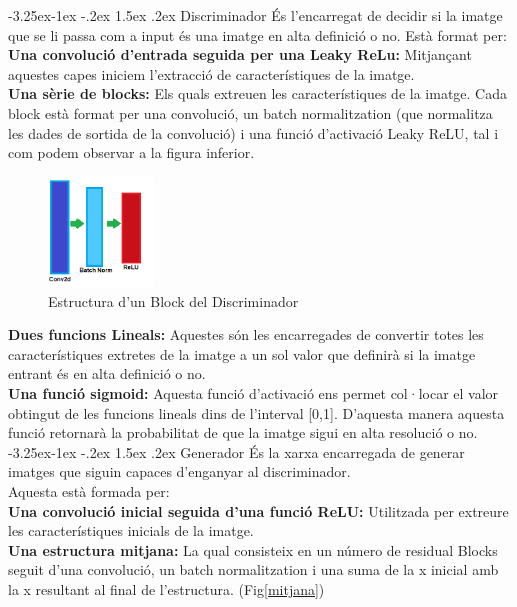 ﻿\documentclass[10pt,a4paper,twocolumn,twoside]{article}
\makeatletter
\renewcommand\subparagraph{\@startsection{subparagraph}{5}{\z@}%
                                     {-3.25ex\@plus -1ex \@minus -.2ex}%
                                     {1.5ex \@plus .2ex}%
                                     {\normalfont\normalsize\bfseries}}
\makeatother
\begin{document}
\subparagraph{Discriminador}
És l'encarregat de decidir si la imatge que se li passa com a input és una imatge en alta definició o no. Està format per:\\

\textbf{Una convolució d'entrada seguida per una Leaky ReLu: }Mitjançant aquestes capes iniciem l'extracció de característiques de la imatge.\\

\textbf{Una sèrie de blocks: }Els quals extreuen les característiques de la imatge. Cada block està format per una convolució, un batch normalitzation (que normalitza les dades de sortida de la convolució) i una funció d'activació Leaky ReLU, tal i com podem observar a la figura inferior.
\begin{figure}[h]
\centering
\includegraphics[width=0.25\textwidth]{img/blockdiscriminator.png}
\caption{Estructura d'un Block del Discriminador}
\end{figure}
\textbf{Dues funcions Lineals: }Aquestes són les encarregades de convertir totes les característiques extretes de la imatge a un sol valor que definirà si la imatge entrant és en alta definició o no.\\

\textbf{Una funció sigmoid: }Aquesta funció d'activació ens permet col·locar el valor obtingut de les funcions lineals dins de l'interval [0,1]. D'aquesta manera aquesta funció retornarà la probabilitat de que la imatge sigui en alta resolució o no.
\subparagraph{Generador}
És la xarxa encarregada de generar imatges que siguin capaces d'enganyar al discriminador.\\
Aquesta està formada per:\\

\textbf{Una convolució inicial seguida d'una funció ReLU: }Utilitzada per extreure les característiques inicials de la imatge.\\

\textbf{Una estructura mitjana:} La qual consisteix en un número de residual Blocks seguit d'una convolució, un batch normalitzation i una suma de la x inicial amb la x resultant al final de l'estructura. (Fig\ref{mitjana})
\end{document}
